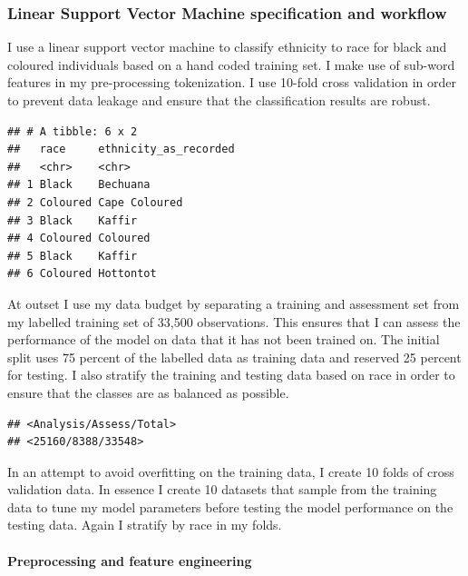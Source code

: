 \documentclass[fleqn,10pt,lineno]{wlpeerj} %
\begin{document}
\hypertarget{linear-support-vector-machine-specification-and-workflow}{%
\subsubsection{Linear Support Vector Machine specification and workflow}\label{linear-support-vector-machine-specification-and-workflow}}

I use a linear support vector machine to classify ethnicity to race for black and coloured individuals based on a hand coded training set. I make use of sub-word features in my pre-processing tokenization. I use 10-fold cross validation in order to prevent data leakage and ensure that the classification results are robust.

\begin{verbatim}
## # A tibble: 6 x 2
##   race     ethnicity_as_recorded
##   <chr>    <chr>                
## 1 Black    Bechuana             
## 2 Coloured Cape Coloured        
## 3 Black    Kaffir               
## 4 Coloured Coloured             
## 5 Black    Kaffir               
## 6 Coloured Hottontot
\end{verbatim}

At outset I use my data budget by separating a training and assessment set from my labelled training set of 33,500 observations. This ensures that I can assess the performance of the model on data that it has not been trained on. The initial split uses 75 percent of the labelled data as training data and reserved 25 percent for testing. I also stratify the training and testing data based on race in order to ensure that the classes are as balanced as possible.

\begin{verbatim}
## <Analysis/Assess/Total>
## <25160/8388/33548>
\end{verbatim}

In an attempt to avoid overfitting on the training data, I create 10 folds of cross validation data. In essence I create 10 datasets that sample from the training data to tune my model parameters before testing the model performance on the testing data. Again I stratify by race in my folds.

\hypertarget{preprocessing-and-feature-engineering}{%
\paragraph{Preprocessing and feature engineering}\label{preprocessing-and-feature-engineering}}
\end{document}
